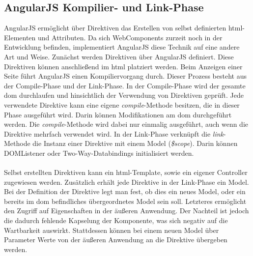 \subsection{AngularJS Kompilier- und Link-Phase}
\label{angularjskompilierundlinkphase}
AngularJS ermöglicht über Direktiven das Erstellen von selbst definierten \gls{html}-Elementen und Attributen. Da sich WebComponents zurzeit noch in der Entwicklung befinden, implementiert AngularJS diese Technik auf eine andere Art und Weise. Zunächst werden Direktiven über AngularJS definiert. Diese Direktiven können anschließend im \gls{html} platziert werden. Beim Anzeigen einer Seite führt AngularJS einen Kompiliervorgang durch. Dieser Prozess besteht aus der Compile-Phase und der Link-Phase. In der Compile-Phase wird der gesamte \gls{dom} durchlaufen und hinsichtlich der Verwendung von Direktiven geprüft. Jede verwendete Direktive kann eine eigene \emph{compile}-Methode besitzen, die in dieser Phase ausgeführt wird. Darin können Modifikationen am \gls{dom} durchgeführt werden. Die \emph{compile}-Methode wird dabei nur einmalig ausgeführt, auch wenn die Direktive mehrfach verwendet wird. In der Link-Phase verknüpft die \emph{link}-Methode die Instanz einer Direktive mit einem Model (\emph{\$scope}). Darin können \gls{DOMListener} oder Two-Way-Databindings initialisiert werden.\cite{AJSCompileAndLink}
\\\\
Selbst erstellten Direktiven kann ein \gls{html}-Template, sowie ein eigener Controller zugewiesen werden. Zusätzlich erhält jede Direktive in der Link-Phase ein Model. Bei der Definition der Direktive legt man fest, ob dies ein neues Model, oder ein bereits im \gls{dom} befindliches übergeordnetes Model sein soll. Letzteres ermöglicht den Zugriff auf Eigenschaften in der äußeren Anwendung. Der Nachteil ist jedoch die dadurch fehlende Kapselung der Komponente, was sich negativ auf die Wartbarkeit auswirkt. Stattdessen können bei einem neuen Model über Parameter Werte von der äußeren Anwendung an die Direktive übergeben werden.\cite{AJSDirectives}

